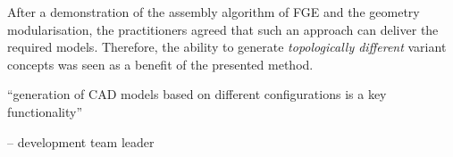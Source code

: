 \documentclass[aerospace,article,submit,moreauthors,pdftex]{Definitions/mdpi}
\begin{document}
After a demonstration of the assembly algorithm of FGE and the geometry modularisation, the practitioners agreed that such an approach can deliver the required models.
Therefore, the ability to generate \textit{topologically different} variant concepts was seen as a benefit of the presented method.







\begin{center}
    “generation of CAD models based on different configurations is a key functionality” 
\end{center}
\begin{flushright}
    -- development team leader
\end{flushright}
\end{document}
